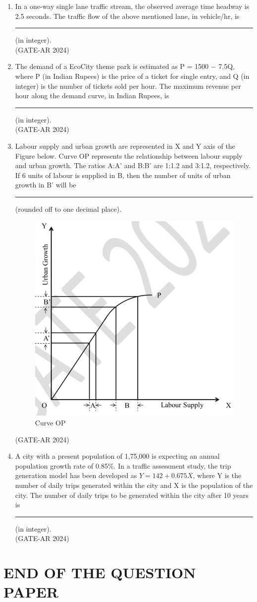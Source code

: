 \documentclass[a4paper,10pt]{article}
\begin{document}
\begin{enumerate}
    \item In a one-way single lane traffic stream, the observed average time headway is 2.5 seconds. The traffic flow of the above mentioned lane, in vehicle/hr, is \rule{2cm}{0.4pt} (in integer). \\
    \hfill (GATE-AR 2024)

    \item The demand of a EcoCity theme park is estimated as P = 1500 ${-}$ 7.5Q, where P (in Indian Rupees) is the price of a ticket for single entry, and Q (in integer) is the number of tickets sold per hour. The maximum revenue per hour along the demand curve, in Indian Rupees, is \rule{2cm}{0.4pt} (in integer). \\
    \hfill (GATE-AR 2024)

    \item Labour supply and urban growth are represented in X and Y axis of the Figure below. Curve OP represents the relationship between labour supply and urban growth. The ratios A:A' and B:B' are 1:1.2 and 3:1.2, respectively. If 6 units of labour is supplied in B, then the number of units of urban growth in B' will be \rule{2cm}{0.4pt} (rounded off to one decimal place). \\
    \begin{figure}[h!]
    \centering
    \includegraphics[width=0.4\columnwidth]{figs/20.jpg}
    \caption{Curve OP}
    \label{fig:Img20}
    \end{figure}
    \hfill (GATE-AR 2024)
    
\newpage

    \item A city with a present population of 1,75,000 is expecting an annual population growth rate of 0.85\%. In a traffic assessment study, the trip generation model has been developed as $Y = 142 + 0.675X$, where Y is the number of daily trips generated within the city and X is the population of the city. The number of daily trips to be generated within the city after 10 years is \rule{2cm}{0.4pt} (in integer). \\
    \hfill (GATE-AR 2024)

\end{enumerate}

\centering
\section*{END OF THE QUESTION PAPER}
\end{document}
